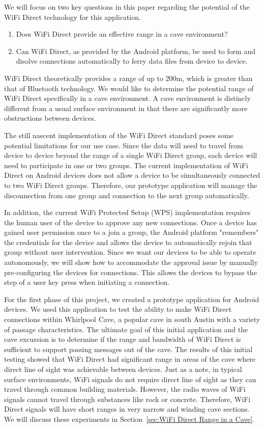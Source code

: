 \documentclass[10pt,twocolumn]{article}
\begin{document}
We will focus on two key questions in this paper regarding the potential of the WiFi Direct technology for this application.
\begin{enumerate}
\item Does WiFi Direct provide an effective range in a cave environment?
\item Can WiFi Direct, as provided by the Android platform, be used to form and disolve connections automatically to ferry data files from device to device.
\end{enumerate} 
WiFi Direct theoretically provides a range of up to 200m, which is greater than that of Bluetooth technology. 
We would like to determine the potential range of WiFi Direct specifically in a cave environment.
A cave environment is distincly different from a usual surface environment in that there are significantly more obstructions between devices. 

The still nascent implementation of the WiFi Direct standard poses some potential limitations for our use case.
Since the data will need to travel from device to device beyond the range of a single WiFi Direct group, 
each device will need to participate in one or two groups. 
The current implementation of WiFi Direct on Android devices does not allow a device to be simultaneously connected to two WiFi Direct groups.
Therefore, our prototype application will manage the disconnection from one group and connection to the next group automatically.

In addition, the current WiFi Protected Setup (WPS) implementation requires the human user of the device to approve any new connections.
Once a device has gained user permission once to a join a group, the Android platform "remembers" the credentials for the device and allows the device to automatically rejoin that group without user intervention.
Since we want our devices to be able to operate autonomously, we will show how to accommodate the approval issue by manually pre-configuring the devices for connections.
This allows the devices to bypass the step of a user key press when initiating a connection.
 
For the first phase of this project, we created a prototype application for Android devices. 
We used this application to test the ability to make WiFi Direct connections within Whirlpool Cave, a popular cave in south Austin with a variety of passage characteristics. 
The ultimate goal of this initial application and the cave excursion is to determine if the range and bandwidth of WiFi Direct is sufficient to support passing messages out of the cave.
The results of this initial testing showed that WiFi Direct had significant range in areas of the cave where direct line of sight was achievable between devices.
Just as a note, in typical surface environments, WiFi signals do not require direct line of sight as they can travel through common building materials.
However, the radio waves of WiFi signals cannot travel through substances like rock or concrete.
Therefore, WiFi Direct signals will have short ranges in very narrow and winding cave sections.
We will discuss these experiments in Section~\ref{sec:WiFi Direct Range in a Cave}.
\end{document}
